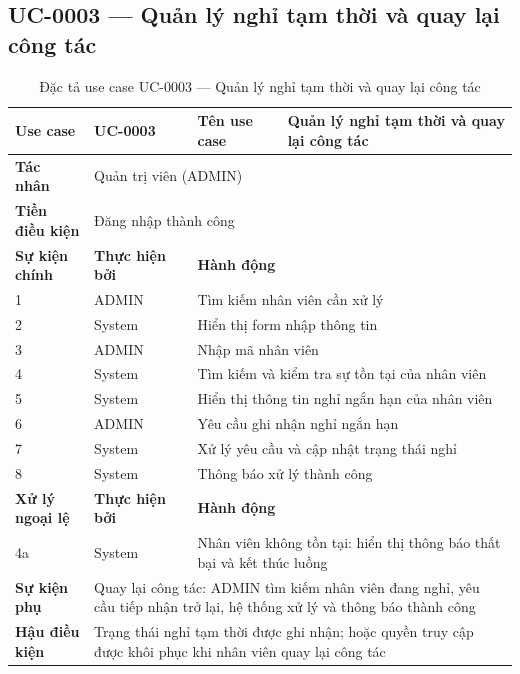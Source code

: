\documentclass[../DoAn.tex]{subfiles}
\begin{document}
\subsection{UC-0003 — Quản lý nghỉ tạm thời và quay lại công tác}

\begin{table}[H]
\centering
\caption{Đặc tả use case UC-0003 — Quản lý nghỉ tạm thời và quay lại công tác}
\label{tab:uc-0003}
\renewcommand{\arraystretch}{1.3}
\begin{tabular}{|p{3.0cm}|p{2.3cm}|p{2.7cm}|p{4.5cm}|}
\hline
\textbf{Use case} & UC-0003 & \textbf{Tên use case} & Quản lý nghỉ tạm thời và quay lại công tác \\
\hline
\textbf{Tác nhân} & \multicolumn{3}{p{9.5cm}|}{Quản trị viên (ADMIN)} \\
\hline
\textbf{Tiền điều kiện} & \multicolumn{3}{p{9.5cm}|}{Đăng nhập thành công} \\
\hline
\textbf{Sự kiện chính} & \textbf{Thực hiện bởi} & \multicolumn{2}{p{7.2cm}|}{\textbf{Hành động}} \\
\hline
1 & ADMIN & \multicolumn{2}{p{7.2cm}|}{Tìm kiếm nhân viên cần xử lý} \\
\hline
2 & System & \multicolumn{2}{p{7.2cm}|}{Hiển thị form nhập thông tin} \\
\hline
3 & ADMIN & \multicolumn{2}{p{7.2cm}|}{Nhập mã nhân viên} \\
\hline
4 & System & \multicolumn{2}{p{7.2cm}|}{Tìm kiếm và kiểm tra sự tồn tại của nhân viên} \\
\hline
5 & System & \multicolumn{2}{p{7.2cm}|}{Hiển thị thông tin nghỉ ngắn hạn của nhân viên} \\
\hline
6 & ADMIN & \multicolumn{2}{p{7.2cm}|}{Yêu cầu ghi nhận nghỉ ngắn hạn} \\
\hline
7 & System & \multicolumn{2}{p{7.2cm}|}{Xử lý yêu cầu và cập nhật trạng thái nghỉ} \\
\hline
8 & System & \multicolumn{2}{p{7.2cm}|}{Thông báo xử lý thành công} \\
\hline
\textbf{Xử lý ngoại lệ} & \textbf{Thực hiện bởi} & \multicolumn{2}{p{7.2cm}|}{\textbf{Hành động}} \\
\hline
4a & System & \multicolumn{2}{p{7.2cm}|}{Nhân viên không tồn tại: hiển thị thông báo thất bại và kết thúc luồng} \\
\hline
\textbf{Sự kiện phụ} & \multicolumn{3}{p{9.5cm}|}{Quay lại công tác: ADMIN tìm kiếm nhân viên đang nghỉ, yêu cầu tiếp nhận trở lại, hệ thống xử lý và thông báo thành công} \\
\hline
\textbf{Hậu điều kiện} & \multicolumn{3}{p{9.5cm}|}{Trạng thái nghỉ tạm thời được ghi nhận; hoặc quyền truy cập được khôi phục khi nhân viên quay lại công tác} \\
\hline
\end{tabular}
\end{table}
\end{document}
